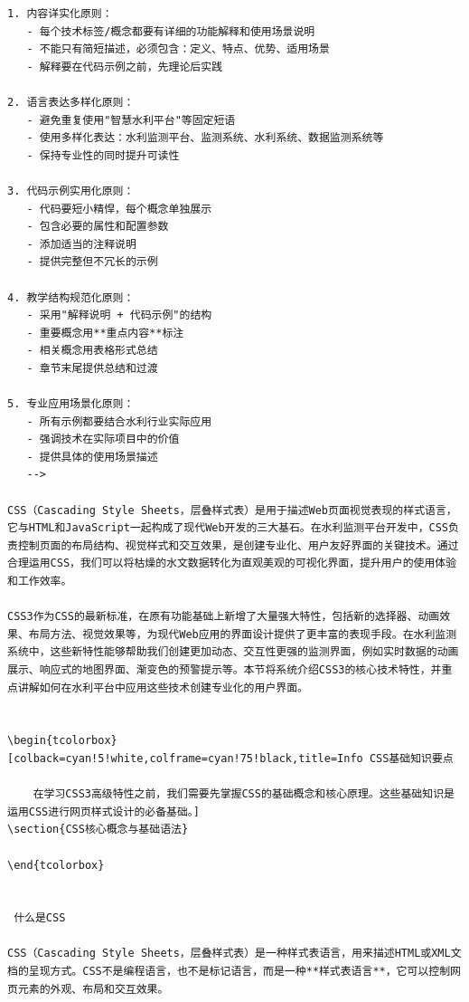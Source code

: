 \begin{lstlisting}
1. 内容详实化原则：
   - 每个技术标签/概念都要有详细的功能解释和使用场景说明
   - 不能只有简短描述，必须包含：定义、特点、优势、适用场景
   - 解释要在代码示例之前，先理论后实践

2. 语言表达多样化原则：
   - 避免重复使用"智慧水利平台"等固定短语
   - 使用多样化表达：水利监测平台、监测系统、水利系统、数据监测系统等
   - 保持专业性的同时提升可读性

3. 代码示例实用化原则：
   - 代码要短小精悍，每个概念单独展示
   - 包含必要的属性和配置参数
   - 添加适当的注释说明
   - 提供完整但不冗长的示例

4. 教学结构规范化原则：
   - 采用"解释说明 + 代码示例"的结构
   - 重要概念用**重点内容**标注
   - 相关概念用表格形式总结
   - 章节末尾提供总结和过渡

5. 专业应用场景化原则：
   - 所有示例都要结合水利行业实际应用
   - 强调技术在实际项目中的价值
   - 提供具体的使用场景描述
   -->

CSS（Cascading Style Sheets，层叠样式表）是用于描述Web页面视觉表现的样式语言，它与HTML和JavaScript一起构成了现代Web开发的三大基石。在水利监测平台开发中，CSS负责控制页面的布局结构、视觉样式和交互效果，是创建专业化、用户友好界面的关键技术。通过合理运用CSS，我们可以将枯燥的水文数据转化为直观美观的可视化界面，提升用户的使用体验和工作效率。

CSS3作为CSS的最新标准，在原有功能基础上新增了大量强大特性，包括新的选择器、动画效果、布局方法、视觉效果等，为现代Web应用的界面设计提供了更丰富的表现手段。在水利监测系统中，这些新特性能够帮助我们创建更加动态、交互性更强的监测界面，例如实时数据的动画展示、响应式的地图界面、渐变色的预警提示等。本节将系统介绍CSS3的核心技术特性，并重点讲解如何在水利平台中应用这些技术创建专业化的用户界面。


\begin{tcolorbox}[colback=cyan!5!white,colframe=cyan!75!black,title=Info CSS基础知识要点
    
    在学习CSS3高级特性之前，我们需要先掌握CSS的基础概念和核心原理。这些基础知识是运用CSS进行网页样式设计的必备基础。]
\section{CSS核心概念与基础语法}

\end{tcolorbox}


 什么是CSS

CSS（Cascading Style Sheets，层叠样式表）是一种样式表语言，用来描述HTML或XML文档的呈现方式。CSS不是编程语言，也不是标记语言，而是一种**样式表语言**，它可以控制网页元素的外观、布局和交互效果。


\end{lstlisting}
